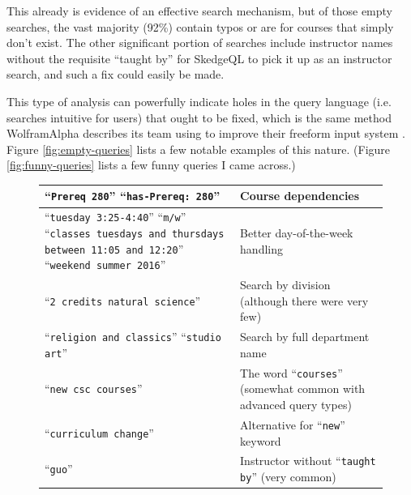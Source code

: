   This already is evidence of an effective search mechanism, but of those empty searches, the vast majority (92\%) contain typos or are for courses that simply don't exist. The other significant portion of searches include instructor names without the requisite ``taught by'' for SkedgeQL to pick it up as an instructor search, and such a fix could easily be made.

  This type of analysis can powerfully indicate holes in the query language (i.e. searches intuitive for users) that ought to be fixed, which is the same method WolframAlpha describes its team using to improve their freeform input system \cite{wolfram2}. Figure \ref{fig:empty-queries} lists a few notable examples of this nature. (Figure \ref{fig:funny-queries} lists a few funny queries I came across.)

  \begin{figure}
  {\renewcommand{\arraystretch}{1.5}
  \centering
  \begin{tabular}{ p{6cm} p{7.5cm} }
  \hline

    ``{\tt Prereq 280}'' \newline ``{\tt has-Prereq: 280}''
    & Course dependencies \\ \hline

    ``{\tt tuesday 3:25-4:40}'' \newline ``{\tt m/w}'' \newline ``{\tt classes tuesdays and thursdays between 11:05 and 12:20}'' \newline ``{\tt weekend summer 2016}''
    & \parbox[c]{\hsize}{Better day-of-the-week handling} \\ \hline

    ``{\tt 2 credits natural science}'' 
    & Search by division (although there were very few) \\ \hline

    ``{\tt religion and classics}'' \newline ``{\tt studio art}'' 
    & Search by full department name \\ \hline

    ``{\tt new csc courses}'' 
    & The word ``{\tt courses}'' (somewhat common with advanced query types) \\ \hline

    ``{\tt curriculum change}'' 
    & Alternative for ``{\tt new}'' keyword \\ \hline

    ``{\tt guo}'' 
    & Instructor without ``{\tt taught by}'' (very common) \\ \hline


\end{tabular}}
\end{figure}
